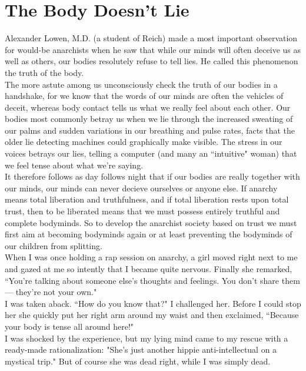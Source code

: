 \section*{The Body Doesn't Lie}
Alexander Lowen, M.D. (a student of Reich) made a most important observation for would-be anarchists when he saw that while our minds will often deceive us as well as others, our bodies resolutely refuse to tell lies. He called this phenomenon the truth of the body.\\
The more astute among us unconsciously check the truth of our bodies in a handshake, for we know that the words of our minds are often the vehicles of deceit, whereas body contact tells us what we really feel about each other. Our bodies most commonly betray us when we lie through the increased sweating of our palms and sudden variations in our breathing and pulse rates, facts that the older lie detecting machines could graphically make visible. The stress in our voices betrays our lies, telling a computer (and many an ``intuitive" woman) that we feel tense about what we're saying.\\
It therefore follows as day follows night that if our bodies are really together with our minds, our minds can never decieve ourselves or anyone else. If anarchy means total liberation and truthfulness, and if total liberation rests upon total trust, then to be liberated means that we must possess entirely truthful and complete bodyminds. So to develop the anarchist society based on trust we must first aim at becoming bodyminds again or at least preventing the bodyminds of our children from splitting.\\
When I was once holding a rap session on anarchy, a girl moved right next to me and gazed at me so intently that I became quite nervous. Finally she remarked, ``You're talking about someone else's thoughts and feelings. You don't share them --- they're not your own."\\
I was taken aback. ``How do you know that?" I challenged her. Before I could stop her she quickly put her right arm around my waist and then exclaimed, ``Because your body is tense all around here!"\\
I was shocked by the experience, but my lying mind came to my rescue with a ready-made rationalization: "She's just another hippie anti-intellectual on a mystical trip." But of course she was dead right, while I was simply dead.

